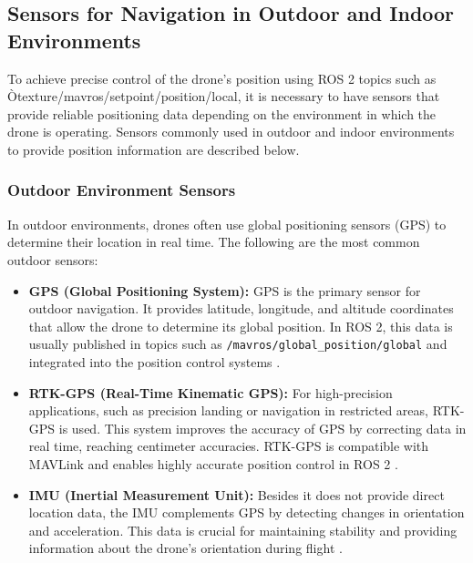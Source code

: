     
\subsection{Sensors for Navigation in Outdoor and Indoor Environments}
To achieve precise control of the drone's position using ROS 2 topics such as Òtexture{/mavros/setpoint/position/local}, it is necessary to have sensors that provide reliable positioning data depending on the environment in which the drone is operating. Sensors commonly used in outdoor and indoor environments to provide position information are described below.    
    \subsubsection{Outdoor Environment Sensors}
    In outdoor environments, drones often use global positioning sensors (GPS) to determine their location in real time. The following are the most common outdoor sensors:
    \begin{itemize}
        \item \textbf{GPS (Global Positioning System):} GPS is the primary sensor for outdoor navigation. It provides latitude, longitude, and altitude coordinates that allow the drone to determine its global position. In ROS 2, this data is usually published in topics such as \texttt{/mavros/global\_position/global} and integrated into the position control systems \cite{gps_reference}.
        \item \textbf{RTK-GPS (Real-Time Kinematic GPS):} For high-precision applications, such as precision landing or navigation in restricted areas, RTK-GPS is used. This system improves the accuracy of GPS by correcting data in real time, reaching centimeter accuracies. RTK-GPS is compatible with MAVLink and enables highly accurate position control in ROS 2 \cite{gps_reference}.
        \item \textbf{IMU (Inertial Measurement Unit):} Besides it does not provide direct location data, the IMU complements GPS by detecting changes in orientation and acceleration. This data is crucial for maintaining stability and providing information about the drone's orientation during flight \cite{gps_reference}.
    \end{itemize}
    
